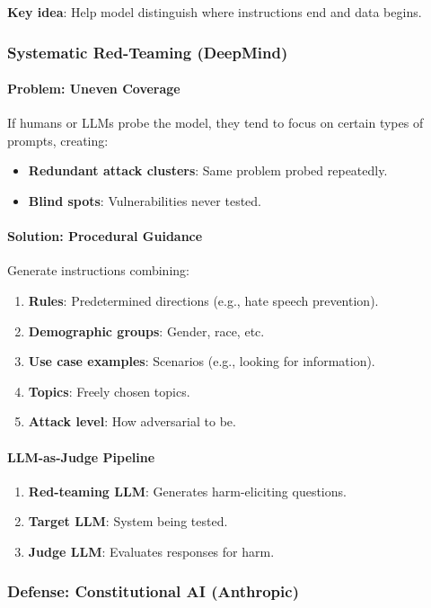 \textbf{Key idea}: Help model distinguish where instructions end and data begins.

\subsubsection*{Systematic Red-Teaming (DeepMind)}

\paragraph*{Problem: Uneven Coverage}
If humans or LLMs probe the model, they tend to focus on certain types of prompts, creating:
\begin{itemize}
  \item \textbf{Redundant attack clusters}: Same problem probed repeatedly.
  \item \textbf{Blind spots}: Vulnerabilities never tested.
\end{itemize}

\paragraph*{Solution: Procedural Guidance}
Generate instructions combining:
\begin{enumerate}
  \item \textbf{Rules}: Predetermined directions (e.g., hate speech prevention).
  \item \textbf{Demographic groups}: Gender, race, etc.
  \item \textbf{Use case examples}: Scenarios (e.g., looking for information).
  \item \textbf{Topics}: Freely chosen topics.
  \item \textbf{Attack level}: How adversarial to be.
\end{enumerate}

\paragraph*{LLM-as-Judge Pipeline}
\begin{enumerate}
  \item \textbf{Red-teaming LLM}: Generates harm-eliciting questions.
  \item \textbf{Target LLM}: System being tested.
  \item \textbf{Judge LLM}: Evaluates responses for harm.
\end{enumerate}

\subsubsection*{Defense: Constitutional AI (Anthropic)}

